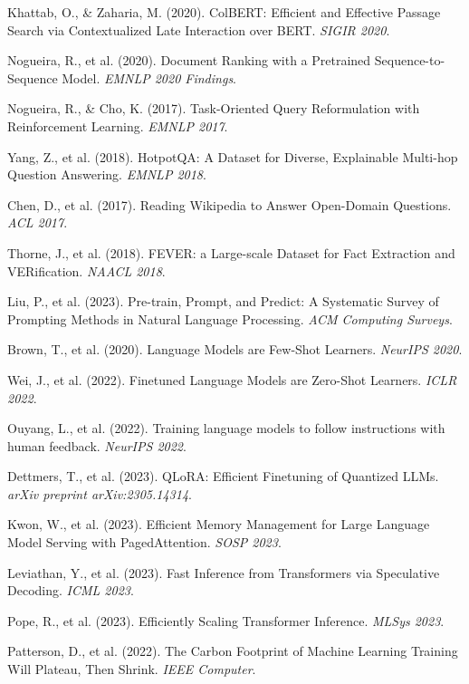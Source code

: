 \documentclass[12pt,a4paper]{article}
\begin{document}
\begin{thebibliography}{99}
Khattab, O., \& Zaharia, M. (2020). ColBERT: Efficient and Effective Passage Search via Contextualized Late Interaction over BERT. \textit{SIGIR 2020}.

Nogueira, R., et al. (2020). Document Ranking with a Pretrained Sequence-to-Sequence Model. \textit{EMNLP 2020 Findings}.

Nogueira, R., \& Cho, K. (2017). Task-Oriented Query Reformulation with Reinforcement Learning. \textit{EMNLP 2017}.

Yang, Z., et al. (2018). HotpotQA: A Dataset for Diverse, Explainable Multi-hop Question Answering. \textit{EMNLP 2018}.

Chen, D., et al. (2017). Reading Wikipedia to Answer Open-Domain Questions. \textit{ACL 2017}.

Thorne, J., et al. (2018). FEVER: a Large-scale Dataset for Fact Extraction and VERification. \textit{NAACL 2018}.

Liu, P., et al. (2023). Pre-train, Prompt, and Predict: A Systematic Survey of Prompting Methods in Natural Language Processing. \textit{ACM Computing Surveys}.

Brown, T., et al. (2020). Language Models are Few-Shot Learners. \textit{NeurIPS 2020}.

Wei, J., et al. (2022). Finetuned Language Models are Zero-Shot Learners. \textit{ICLR 2022}.

Ouyang, L., et al. (2022). Training language models to follow instructions with human feedback. \textit{NeurIPS 2022}.

Dettmers, T., et al. (2023). QLoRA: Efficient Finetuning of Quantized LLMs. \textit{arXiv preprint arXiv:2305.14314}.

Kwon, W., et al. (2023). Efficient Memory Management for Large Language Model Serving with PagedAttention. \textit{SOSP 2023}.

Leviathan, Y., et al. (2023). Fast Inference from Transformers via Speculative Decoding. \textit{ICML 2023}.

Pope, R., et al. (2023). Efficiently Scaling Transformer Inference. \textit{MLSys 2023}.

Patterson, D., et al. (2022). The Carbon Footprint of Machine Learning Training Will Plateau, Then Shrink. \textit{IEEE Computer}.


\end{thebibliography}
\end{document}
